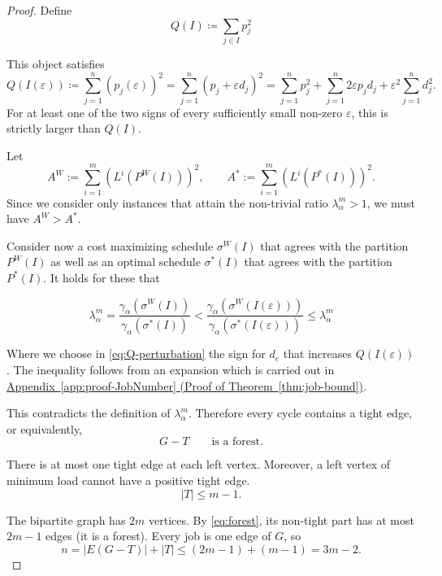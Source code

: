 \documentclass[%
english, titlepage=false %
]{./tum-templates/book/tumbook}
\begin{document}
\begin{proof}
Define
\[
Q(I)\coloneqq \sum_{j \in I} p^2_j
\]

This object satisfies
\begin{equation}\label{eq:Q-perturbation}
 Q(I(\varepsilon)) \coloneqq \sum_{j=1}^{n} (p_j(\varepsilon))^2 = \sum_{j=1}^{n} (p_j+\varepsilon d_j)^2 = \sum_{j=1}^{n}p_j^2+ \sum_{j=1}^{n}2\varepsilon p_jd_j + \varepsilon^2 \sum_{j=1}^{n}d_j^2.
\end{equation}
For at least one of the two signs of every sufficiently small non-zero $\varepsilon$, this
is strictly larger than $Q(I)$.

Let
\[
 A^W:=\sum_{i=1}^{m} \left(L^i(P^{W}(I))\right)^2,
 \qquad A^{*}:=\sum_{i=1}^{m} \left(L^i(P^{*}(I))\right)^2.
\]
Since we consider only instances that attain the non-trivial ratio
$\lambda^{m}_{\alpha}>1$, we must have
$A^{W}>A^{*}$.


Consider now a cost maximizing schedule $\sigma^W(I)$ that agrees with the partition $P^W(I)$ 
as well as an optimal schedule $\sigma^{*}(I)$ that agrees with the partition $P^{*}(I)$.
It holds for these that

\[
\lambda_{\alpha}^{m}=
\frac{\gamma_{\alpha}(\sigma^W(I))}{\gamma_{\alpha}(\sigma^{*}(I))}
<
\frac{\gamma_{\alpha}(\sigma^W(I(\varepsilon)))}{\gamma_{\alpha}(\sigma^{*}(I(\varepsilon)))} \le \lambda_{\alpha}^m
\]

Where we choose in \eqref{eq:Q-perturbation} the sign for $d_{e}$ that increases $Q(I(\varepsilon))$.
The inequality follows from an expansion which is carried out in \hyperlink{proof:JobNumber}{Appendix~\ref{app:proof-JobNumber}
(Proof of Theorem~\ref*{thm:job-bound})}.


This contradicts the definition of
$\lambda_{\alpha}^m$.  Therefore every cycle contains a tight
edge, or equivalently,
\begin{equation}\label{eq:forest}
 G-T \qquad \text{is a forest}.
\end{equation}

There is at most one tight edge at each left vertex.  Moreover, a left
vertex of minimum load cannot have a positive tight edge.
\begin{equation}\label{eq:C-bound}
 |T|\leq m-1.
\end{equation}

The bipartite graph has $2m$ vertices.  By
\eqref{eq:forest}, its non-tight part has at most $2m-1$ edges (it is a forest).
Every job is one edge of $G$, so
\[
 n=|E(G-T)|+|T|
 \leq(2m-1)+(m-1)=3m-2.
\]
\end{proof}
\end{document}
